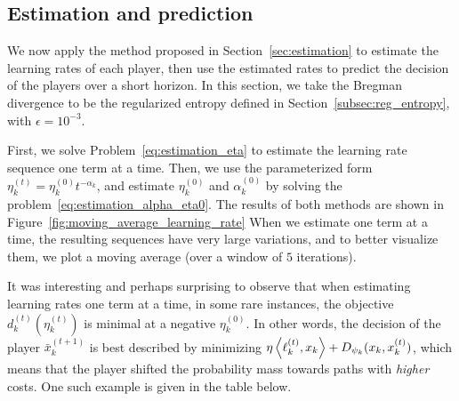 \documentclass{sig-alternate-ipsn13}
\begin{document}
%



\subsection{Estimation and prediction}
We now apply the method proposed in Section~\ref{sec:estimation} to estimate the learning rates of each player, then use the estimated rates to predict the decision of the players over a short horizon. In this section, we take the Bregman divergence to be the regularized entropy defined in Section~\ref{subsec:reg_entropy}, with $\epsilon = 10^{-3}$.


First, we solve Problem~\eqref{eq:estimation_eta} to estimate the learning rate sequence one term at a time. Then, we use the parameterized form $\eta^{(t)}_k = \eta_k^{(0)} t^{-\alpha_k}$, and estimate $\eta_k^{(0)}$ and $\alpha_k^{(0)}$ by solving the problem~\ref{eq:estimation_alpha_eta0}. The results of both methods are shown in Figure~\eqref{fig:moving_average_learning_rate}
When we estimate one term at a time, the resulting sequences have very large variations, and to better visualize them, we plot a moving average (over a window of $5$ iterations).

It was interesting and perhaps surprising to observe that when estimating learning rates one term at a time, in some rare instances, the objective $d^{(t)}_k(\eta_k^{(t)})$ is minimal at a negative $\eta_k^{(0)}$. In other words, the decision of the player $\bar x^{(t+1)}_k$ is best described by minimizing $\eta \left\langle \ell^{(t)}_k, x_k \right\rangle + D_{\psi_k}(x_k, x^{(t)}_k)$, which means that the player shifted the probability mass towards paths with \emph{higher} costs. One such example is given in the table below.
\end{document}

